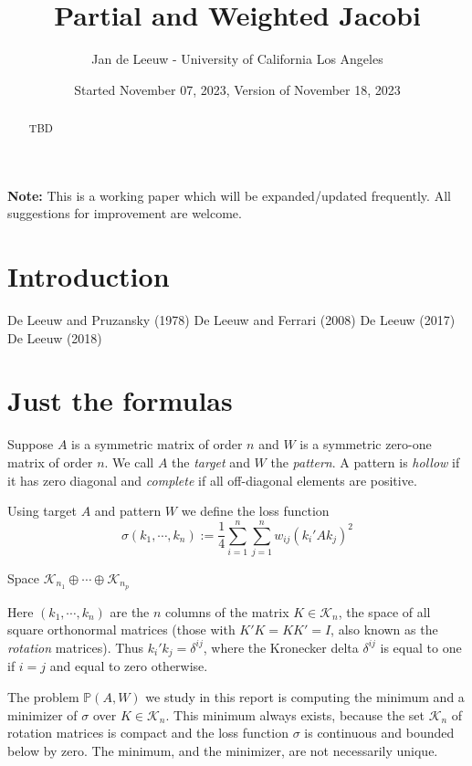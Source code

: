 \documentclass[
  12pt,
]{article}
\title{Partial and Weighted Jacobi}
\author{Jan de Leeuw - University of California Los Angeles}
\date{Started November 07, 2023, Version of November 18, 2023}
\newcommand{\sij}{\sum_{i=1}^n\sum_{j=1}^n}
\begin{document}
\maketitle
\begin{abstract}
TBD
\end{abstract}

{
\setcounter{tocdepth}{3}
\tableofcontents
}
\textbf{Note:} This is a working paper which will be expanded/updated frequently. All suggestions for improvement are welcome.

\section{Introduction}\label{introduction}

De Leeuw and Pruzansky (1978)
De Leeuw and Ferrari (2008)
De Leeuw (2017)
De Leeuw (2018)

\section{Just the formulas}\label{just-the-formulas}

Suppose \(A\) is a symmetric matrix of order \(n\) and \(W\) is a symmetric zero-one matrix of order \(n\). We call \(A\) the \emph{target} and \(W\) the \emph{pattern}. A pattern is \emph{hollow} if it has zero diagonal and \emph{complete} if all off-diagonal elements are positive.

Using target \(A\) and pattern \(W\) we define the loss function
\begin{equation}
\sigma(k_1,\cdots,k_n):=\frac14\sij w_{ij}(k_i'Ak_j)^2
\label{eq:loss}
\end{equation}

Space \(\mathcal{K}_{n_1}\oplus\cdots\oplus\mathcal{K}_{n_p}\)

Here \((k_1,\cdots,k_n)\) are the \(n\) columns of the matrix \(K\in\mathcal{K}_n\), the space of all square orthonormal matrices (those with \(K'K=KK'=I\), also known as the \emph{rotation} matrices).
Thus \(k_i'k_j=\delta^{ij}\), where the Kronecker delta \(\delta^{ij}\)
is equal to one if \(i=j\) and equal to zero otherwise.

The problem \(\mathbb{P}(A,W)\) we study in this report is computing the minimum and a minimizer of \(\sigma\) over \(K\in\mathcal{K}_n\). This minimum always exists, because the set \(\mathcal{K}_n\) of rotation matrices is compact and the loss function \(\sigma\) is continuous and bounded below by zero. The minimum, and the minimizer, are not necessarily unique.
\end{document}
